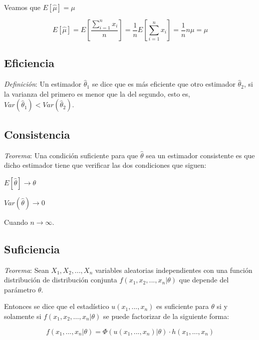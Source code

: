 \documentclass[a4paper, 10pt]{article} %
\begin{document}
Veamos que $E\left[\hat{\mu}\right]=\mu$

$$E\left[\hat{\mu}\right] = E\left[\frac{\sum_{i=1}^{n}x_i}{n}\right] = \frac{1}{n}E\left[\sum_{i=1}^{n}x_i\right] = \frac{1}{n}n\mu = \mu $$

\subsection{Eficiencia}
\emph{Definición}: Un estimador $\hat{\theta}_1$ se dice que es más eficiente que otro estimador
$\hat{\theta}_2$, si la varianza del primero es menor que la del segundo, esto es,  $Var(\hat{\theta}_1)<Var(\hat{\theta}_2)$.

\subsection{Consistencia}
\emph{Teorema}: Una condición suficiente para que $\hat{\theta}$ sea un estimador consistente es que
dicho estimador tiene que verificar las dos condiciones que siguen:

\begin{description}
	\item $E[\hat{\theta}] \rightarrow \theta$
	\item $Var(\hat{\theta}) \rightarrow 0$
	\item Cuando $n \rightarrow \infty$.
\end{description}

\subsection{Suficiencia}
\emph{Teorema}: Sean $X_1, X_2, ..., X_n$ variables aleatorias independientes con una función
distribución de distribución conjunta $f(x_1, x_2, ..., x_n | \theta)$ que depende del parámetro $\theta$.

Entonces se dice que el estadístico $u(x_1, ..., x_n)$ es suficiente para $\theta$ si y solamente si
$f(x_1, x_2,\dots, x_n | \theta)$ se puede factorizar de la siguiente forma:

$$ f(x_1,...,x_n| \theta) = \Phi(u(x_1, ..., x_n) | \theta)\cdot h(x_1, ..., x_n) $$
\end{document}
